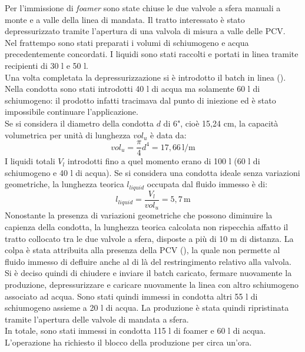 Per l'immissione di \textit{foamer} sono state chiuse le due valvole a sfera manuali a monte e a valle della linea di mandata. Il tratto interessato è stato depressurizzato tramite l'apertura di una valvola di misura a valle delle PCV.\\
Nel frattempo sono stati preparati i volumi di schiumogeno e acqua precedentemente concordati. I liquidi sono stati raccolti e portati in linea tramite recipienti di 30 l e 50 l. \\
Una volta completata la depressurizzazione si è introdotto il batch in linea (). Nella condotta sono stati introdotti 40 l di acqua ma solamente 60 l di schiumogeno: il prodotto infatti tracimava dal punto di iniezione ed è stato impossibile continuare l'applicazione.\\
Se si considera il diametro della condotta \(d\) di 6", cioè 15,24 cm, la capacità volumetrica per unità di lunghezza \(vol_u\) è data da:
\[vol_{u}=\dfrac{\pi}{4}d^4=17,66 \, \mathrm{l/m} \]
I liquidi totali \(V_l\) introdotti fino a quel momento erano di 100 l (60 l di schiumogeno e 40 l di acqua). Se si considera una condotta ideale senza variazioni geometriche, la lunghezza teorica \(l_{liquid}\) occupata dal fluido immesso è di:
\[l_{liquid}=\dfrac{V_l}{vol_u}=5,7 \, \mathrm{m} \]
Nonostante la presenza di variazioni geometriche che possono diminuire la capienza della condotta, la lunghezza teorica calcolata non rispecchia affatto il tratto collocato tra le due valvole a sfera, disposte a più di 10 m di distanza. La colpa è stata attribuita alla presenza della PCV (), la quale non permette al fluido immesso di defluire anche al di là del restringimento relativo alla valvola.\\
Si è deciso quindi di chiudere e inviare il batch caricato, fermare nuovamente la produzione, depressurizzare e caricare nuovamente la linea con altro schiumogeno associato ad acqua. Sono stati quindi immessi in condotta altri 55 l di schiumogeno assieme a 20 l di acqua. La produzione è stata quindi ripristinata tramite l'apertura delle valvole di mandata a sfera.\\
In totale, sono stati immessi in condotta 115 l di foamer e 60 l di acqua. L'operazione ha richiesto il blocco della produzione per circa un'ora.
